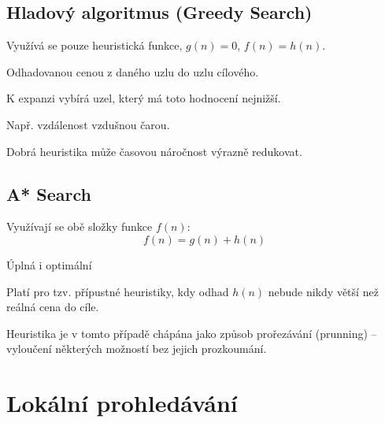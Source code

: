 \subsection{Hladový algoritmus (Greedy Search)}

\begin{compactitem}
    \item {}

    \item Využívá se pouze heuristická funkce, $g(n) = 0$, $f(n) = h(n)$. \begin{compactitem}
        \item Odhadovanou cenou z daného uzlu do uzlu cílového.
        \item K expanzi vybírá uzel, který má toto hodnocení nejnižší.
        \item Např. vzdálenost vzdušnou čarou.
    \end{compactitem}

    \item Dobrá heuristika může časovou náročnost výrazně redukovat.
\end{compactitem}

\subsection{A* Search}

\begin{compactitem}
    \item Využívají se obě složky funkce $f(n)$:
    $$ f(n) = g(n) + h(n) $$

    \item Úplná i optimální \begin{compactitem}
        \item Platí pro tzv. přípustné heuristiky, kdy odhad $h(n)$ nebude nikdy větší než reálná cena do cíle.
    \end{compactitem}

    \item Heuristika je v tomto případě chápána jako způsob prořezávání (prunning) -- vyloučení některých možností bez jejich prozkoumání.
\end{compactitem}


\section{Lokální prohledávání}

